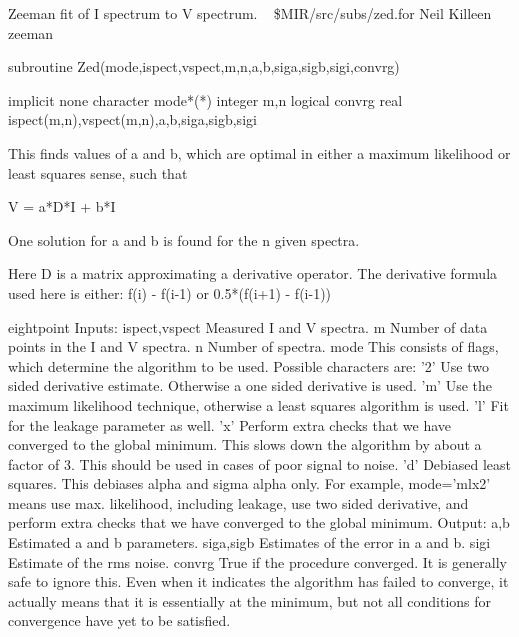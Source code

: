 %
\noindent Zeeman fit of I spectrum to V spectrum.
\newline \ 
\newline {} \$MIR/src/subs/zed.for
\newline {} Neil Killeen
\newline {} zeeman
\par{\tenpoint
{\eightpoint\begintt
        subroutine Zed(mode,ispect,vspect,m,n,a,b,siga,sigb,sigi,convrg)

        implicit none
        character mode*(*)
        integer m,n
        logical convrg
        real ispect(m,n),vspect(m,n),a,b,siga,sigb,sigi

  This finds values of a and b, which are optimal in either a maximum
  likelihood or least squares sense, such that

    V = a*D*I + b*I

  One solution for a and b is found for the n given spectra.

  Here D is a matrix approximating a derivative operator. The derivative
  formula used here is either:
    f(i) - f(i-1)
  or
    0.5*(f(i+1) - f(i-1))
\endtt}
{eightpoint\begintt
  Inputs:
    ispect,vspect Measured I and V spectra.
    m          Number of data points in the I and V spectra.
    n          Number of spectra.
    mode       This consists of flags, which determine
               the algorithm to be used. Possible characters are:
                 '2'   Use two sided derivative estimate. Otherwise a
                       one sided derivative is used.
                 'm'   Use the maximum likelihood technique, otherwise a 
                       least squares algorithm is used.
                 'l'   Fit for the leakage parameter as well.
                 'x'   Perform extra checks that we have converged to the
                       global minimum. This slows down the algorithm by
                       about a factor of 3. This should be used in cases
                       of poor signal to noise.
                  'd'  Debiased least squares. This debiases alpha and sigma
                       alpha only.
               For example, mode='mlx2' means use max. likelihood, including
               leakage, use two sided derivative, and perform extra checks
               that we have converged to the global minimum.
  Output:
    a,b        Estimated a and b parameters.
    siga,sigb  Estimates of the error in a and b.
    sigi       Estimate of the rms noise.
    convrg     True if the procedure converged. It is generally safe to
               ignore this. Even when it indicates the algorithm has
               failed to converge, it actually means that it is essentially
               at the minimum, but not all conditions for convergence have
               yet to be satisfied.
\endtt}
\par}

